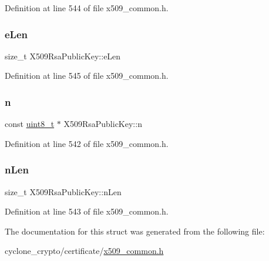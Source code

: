 Definition at line 544 of file x509\+\_\+common.\+h.

\mbox{\label{structX509RsaPublicKey_af531c21f55e40fb06165cd151dd96fa4}} 
\subsubsection{\texorpdfstring{e\+Len}{eLen}}
{\footnotesize\ttfamily size\+\_\+t X509\+Rsa\+Public\+Key\+::e\+Len}



Definition at line 545 of file x509\+\_\+common.\+h.

\mbox{\label{structX509RsaPublicKey_acda40dfd0c6f2b68e0ba227e59bfb727}} 
\subsubsection{\texorpdfstring{n}{n}}
{\footnotesize\ttfamily const \hyperlink{stdint_8h_aba7bc1797add20fe3efdf37ced1182c5}{uint8\+\_\+t} $\ast$ X509\+Rsa\+Public\+Key\+::n}



Definition at line 542 of file x509\+\_\+common.\+h.

\mbox{\label{structX509RsaPublicKey_a8311e7f5f00c9faaf36640f9dbd7cdb5}} 
\subsubsection{\texorpdfstring{n\+Len}{nLen}}
{\footnotesize\ttfamily size\+\_\+t X509\+Rsa\+Public\+Key\+::n\+Len}



Definition at line 543 of file x509\+\_\+common.\+h.



The documentation for this struct was generated from the following file\+:\begin{DoxyCompactItemize}
\item 
cyclone\+\_\+crypto/certificate/\hyperlink{certificate_2x509__common_8h}{x509\+\_\+common.\+h}\end{DoxyCompactItemize}
